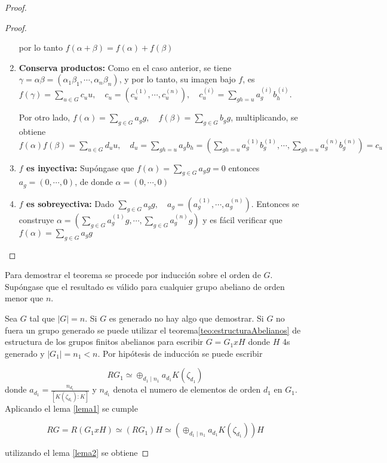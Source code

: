 \begin{proof}
\begin{proof}
\begin{enumerate}
por lo tanto $f(\alpha + \beta) = f(\alpha) + f(\beta)$

\item \textbf{Conserva productos:} Como en el caso anterior, se tiene $\gamma = \alpha\beta = (\alpha_1\beta_1, \cdots, \alpha_n\beta_n)$, y por lo tanto, su imagen bajo $f$, es $f(\gamma) = \sum_{u \in G}c_uu, \quad c_u = (c_u^{(1)}, \cdots, c_u^{(n)}), \quad c_u^{(i)} = \sum_{gh=u}a_g^{(i)}b_h^{(i)}$.

Por otro lado, $f(\alpha) = \sum_{g \in G}a_gg, \quad f(\beta) = \sum_{g \in G}b_gg$, multiplicando, se obtiene $f(\alpha)f(\beta) = \sum_{u \in G}d_uu, \quad d_u = \sum_{gh = u }a_gb_h = \left( \sum_{gh=u}a_g^{(1)}b_g^{(1)}, \cdots, \sum_{gh=u}a_g^{(n)}b_g^{(n) } \right) = c_u$

\item \textbf{$f$ es inyectiva:} Supóngase que $f(\alpha) = \sum_{g\in G}a_gg = 0$ entonces $a_g = (0, \cdots, 0)$, de donde $\alpha = (0, \cdots, 0)$ 

\item \textbf{$f$ es sobreyectiva: } Dado $\sum_{g \in G}a_gg, \quad a_g = (a_g^{(1)}, \cdots, a_g^{(n)})$. Entonces se construye $\alpha = \left( \sum_{g\in G}a_g^{(1)}g, \cdots, \sum_{g\in G}a_g^{(n)}g  \right)$ y es fácil verificar que $f(\alpha) = \sum_{g \in G}a_gg$ \qedhere
\end{enumerate}
\end{proof}



Para demostrar el teorema se procede por inducción sobre el orden de $G$. Supóngase que el resultado es válido para cualquier grupo abeliano de orden menor que $n$. 

Sea $G$ tal que $|G| = n$. Si $G$ es generado no hay algo que demostrar. Si $G$ no fuera un grupo generado se puede utilizar el teorema\ref{teo:estructuraAbelianos} de estructura de los grupos finitos abelianos para escribir $G = G_1 x H$ donde $H$ 4s generado y $|G_1| = n_1 < n$. Por hipótesis de inducción se puede escribir 

\[ RG_1 \simeq \oplus_{d_1\mid n_1} a_{d_1}K(\zeta_{d_1})   \]
donde $a_{d_1} = \frac{n_{d_1}}{[K(\zeta_{d_1}):K]}$ y $n_{d_1}$ denota el numero de elementos de orden $d_1$ en $G_1$. Aplicando el lema \ref{lema1} se cumple

\[  RG = R(G_1 x H) \simeq (RG_1)H \simeq \left(\oplus_{d_1\mid n_1}a_{d_1}K(\zeta_{d_1})\right) H   \]

utilizando el lema \ref{lema2} se obtiene


\end{proof}
